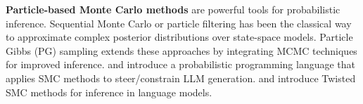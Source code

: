 \textbf{Particle-based Monte Carlo methods} are powerful tools for probabilistic inference. Sequential Monte Carlo \citep{sequentialmonte} or particle filtering \citep{nonlinearfiltering} has been the classical way to approximate complex posterior distributions over state-space models. Particle Gibbs (PG) sampling \citep{andrieu2010particlemarkov} extends these approaches by integrating MCMC techniques for improved inference. \cite{lew2023sequentialmontecarlosteering} and \cite{loula2025syntactic} introduce a probabilistic programming language that applies SMC methods to steer/constrain LLM generation. \cite{zhao2024probabilisticinferencelanguagemodels} and \cite{feng2024stepbystepreasoningmathproblems} introduce Twisted SMC methods for inference in language models. 







